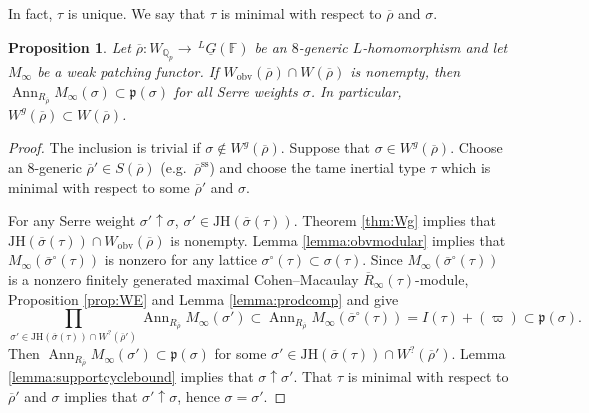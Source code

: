 \documentclass[oneside,a4paper,english, 11pt]{amsart}
\theoremstyle{plain}
\theoremstyle{plain}
\newtheorem{prop}[thm]{Proposition}
\theoremstyle{plain}
\theoremstyle{plain}
\theoremstyle{plain}
\theoremstyle{plain}
\theoremstyle{definition}
\theoremstyle{definition}
\theoremstyle{definition}
\theoremstyle{remark}
\numberwithin{equation}{section}
\newcommand{\Q}{\mathbb{Q}}
\newcommand{\F}{\mathbb{F}}
\newcommand{\fp}{\mathfrak{p}}
\newcommand{\semis}{\mathrm{ss}}
\newcommand{\un}[1]{\underline{#1}}
\newcommand{\JH}{\mathrm{JH}}
\newcommand{\rhobar}{\overline{\rho}}
\newcommand{\ovl}[1]{\overline{#1}}
\DeclareMathOperator{\Ann}{Ann}
\newcommand{\ra}{\rightarrow}
\begin{document}
In fact, $\tau$ is unique. 
We say that $\tau$ is minimal with respect to $\rhobar$ and $\sigma$. 

\begin{prop}\label{prop:supportcyclebound}
Let $\rhobar: W_{\Q_p} \ra \, ^L \un{G}(\F)$ be an $8$-generic $L$-homomorphism and let $M_\infty$ be a weak patching functor. 
If $W_{\mathrm{obv}}(\rhobar) \cap W(\rhobar)$ is nonempty, then $\Ann_{R_{\rhobar}} M_\infty(\sigma) \subset \fp(\sigma)$ for all Serre weights $\sigma$. 
In particular, $W^g(\rhobar) \subset W(\rhobar)$.
\end{prop}
\begin{proof}
The inclusion is trivial if $\sigma \notin W^g(\rhobar)$.
Suppose that $\sigma \in W^g(\rhobar)$.
Choose an $8$-generic $\rhobar'\in S(\rhobar)$ (e.g.~$\rhobar^{\semis}$) and choose the tame inertial type $\tau$ which is minimal with respect to some $\rhobar'$ and $\sigma$. 
%
%
%

For any Serre weight $\sigma' \uparrow \sigma$, $\sigma' \in \JH(\ovl{\sigma}(\tau))$. 
Theorem \ref{thm:Wg} implies that $\JH(\ovl{\sigma}(\tau)) \cap W_{\mathrm{obv}}(\rhobar)$ is nonempty.
Lemma \ref{lemma:obvmodular} implies that $M_\infty(\ovl{\sigma}^\circ(\tau))$ is nonzero for any lattice $\sigma^\circ(\tau) \subset \sigma(\tau)$. 
Since $M_\infty(\ovl{\sigma}^\circ(\tau))$ is a nonzero finitely generated maximal Cohen--Macaulay $\ovl{R}_\infty(\tau)$-module, Proposition \ref{prop:WE} and Lemma \ref{lemma:prodcomp} and give 
\[
\prod_{\sigma' \in \JH(\ovl{\sigma}(\tau)) \cap W^?(\rhobar')} \Ann_{R_{\rhobar}} M_\infty(\sigma') \subset \Ann_{R_{\rhobar}} M_\infty(\ovl{\sigma}^\circ(\tau)) = I(\tau) +(\varpi)\subset \fp(\sigma).
%
\]
%
Then $\Ann_{R_{\rhobar}} M_\infty(\sigma') \subset \fp(\sigma)$ for some $\sigma' \in \JH(\ovl{\sigma}(\tau)) \cap W^?(\rhobar')$. 
Lemma \ref{lemma:supportcyclebound} implies that $\sigma \uparrow \sigma'$. 
That $\tau$ is minimal with respect to $\rhobar'$ and $\sigma$ implies that $\sigma' \uparrow \sigma$, hence $\sigma = \sigma'$.
\end{proof}
\end{document}
